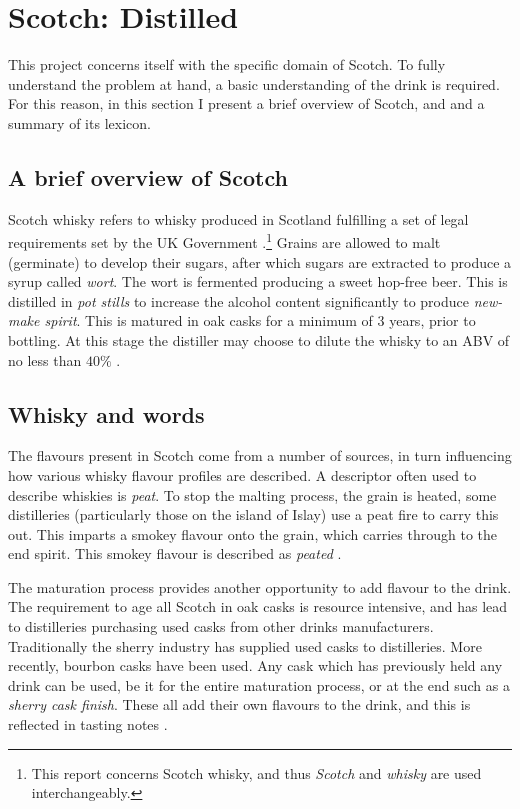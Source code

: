 \section{Scotch: Distilled}\label{sec:whisky}
This project concerns itself with the specific domain of Scotch. To fully understand the problem at hand, a basic
understanding of the drink is required.  For this reason, in this section I present a brief overview of Scotch, and 
and a summary of its lexicon.

\subsection{A brief overview of Scotch}
Scotch whisky refers to whisky produced in Scotland fulfilling a set of legal requirements set by the UK Government 
\cite{legislation.gov.uk_2009}.\footnote{This report concerns Scotch whisky, and thus \emph{Scotch} and \emph{whisky} 
are used interchangeably.}  Grains are allowed to malt (germinate) to develop their sugars, after which sugars are
extracted to produce a syrup called \emph{wort}.  The wort is fermented producing a sweet hop-free beer.  This is
distilled in \emph{pot stills} to increase the alcohol content significantly to produce \emph{new-make spirit}. This
is matured in oak casks for a minimum of 3 years, prior to bottling.  At this stage the distiller may choose
to dilute the whisky to an ABV of no less than $40\%$ \cite{Jacques2003, Pyke1965}.

\subsection{Whisky and words}
The flavours present in Scotch come from a number of sources, in turn influencing how various whisky
flavour profiles are described.  A descriptor often used to describe whiskies is \emph{peat}.
To stop the malting process, the grain is heated, some distilleries (particularly those on the island of Islay) use
a peat fire to carry this out.  This imparts a smokey flavour onto the grain, which carries through to the end spirit.
This smokey flavour is described as \emph{peated} \cite{Jacques2003, Bathgate2019}.

The maturation process provides another opportunity to add flavour to the drink.  The requirement to age all Scotch in 
oak casks is resource intensive, and has lead to distilleries purchasing used casks from other drinks manufacturers.
Traditionally the sherry industry has supplied used casks to distilleries. More recently, bourbon casks have been 
used.  Any cask which has previously held any drink can be used, be it for the entire maturation process, or at the end
such as a \emph{sherry cask finish}.  These all add their own flavours to the drink, and this is reflected in 
tasting notes \cite{Jacques2003, Mosedale1998}.